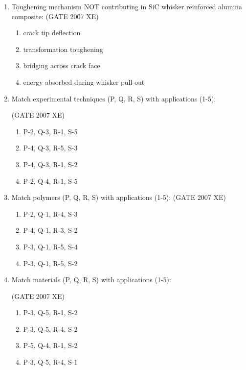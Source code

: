 \documentclass[journal,cmex10]{IEEEtran}
\theoremstyle{remark}
\numberwithin{equation}{enumi}
\numberwithin{figure}{enumi}
\begin{document}
\begin{enumerate}
\item  Toughening mechanism NOT contributing in SiC whisker reinforced alumina composite:  
\hfill{(GATE 2007 XE)}
\begin{multicols}{2}
\begin{enumerate}
    \item crack tip deflection
    \item transformation toughening
    \item bridging across crack face
    \item energy absorbed during whisker pull-out
\end{enumerate}
\end{multicols}


\item Match experimental techniques (P, Q, R, S) with applications (1-5):  

\hfill{(GATE 2007 XE)}

\begin{multicols}{2}
\begin{enumerate}
    \item P-2, Q-3, R-1, S-5
    \item P-4, Q-3, R-5, S-3
    \item P-4, Q-3, R-1, S-2
    \item P-2, Q-4, R-1, S-5
\end{enumerate}
\end{multicols}


\item  Match polymers (P, Q, R, S) with applications (1-5):    
\hfill{(GATE 2007 XE)}


\begin{multicols}{2}
\begin{enumerate}
    \item P-2, Q-1, R-4, S-3
    \item P-4, Q-1, R-3, S-2
    \item P-3, Q-1, R-5, S-4
    \item P-3, Q-1, R-5, S-2
\end{enumerate}
\end{multicols}

\newpage
\item  Match materials (P, Q, R, S) with applications (1-5):  


\hfill{(GATE 2007 XE)}
\begin{multicols}{2}
\begin{enumerate}
    \item P-3, Q-5, R-1, S-2
    \item P-3, Q-5, R-4, S-2
    \item P-5, Q-4, R-1, S-2
    \item P-3, Q-5, R-4, S-1
\end{enumerate}
\end{multicols}


\end{enumerate}
\end{document}
